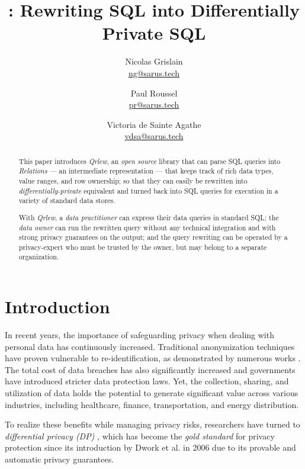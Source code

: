 \documentclass{article}
\title{\qrlew: Rewriting SQL into Differentially Private SQL}
\author {
    Nicolas Grislain\\
    \href{mailto:ng@sarus.tech}{ng@sarus.tech}
    \and
    Paul Roussel\\
    \href{mailto:pr@sarus.tech}{pr@sarus.tech}
    \and
    Victoria de Sainte Agathe\\
    \href{mailto:vdsa@sarus.tech}{vdsa@sarus.tech}
}
\date{\displaydate{date}}
\newcommand{\qrlew}{\emph{Qrlew}}
\begin{document}
\maketitle

\begin{abstract}
    This paper introduces \qrlew{}, an \emph{open source} library that can parse SQL queries into \emph{Relations} --- an intermediate representation --- that keeps track of rich data types, value ranges, and row ownership; so that they can easily be rewritten into \emph{differentially-private} equivalent and turned back into SQL queries for execution in a variety of standard data stores.
    
    With \qrlew{}, a \emph{data practitioner} can express their data queries in standard SQL; the \emph{data owner} can run the rewritten query without any technical integration and with strong privacy guarantees on the output; and the query rewriting can be operated by a privacy-expert who must be trusted by the owner, but may belong to a separate organization.
    \end{abstract}
    
    \section{Introduction}
    
    In recent years, the importance of safeguarding privacy when dealing with personal data has continuously increased.
    Traditional anonymization techniques have proven vulnerable to re-identification, as demonstrated by numerous works \cite{archie2018s, dwork2017exposed, narayanan2008robust, sweeney2013identifying}.
    The total cost of data breaches has also significantly increased \cite{ibm2023cost} and governments have introduced stricter data protection laws.
    Yet, the collection, sharing, and utilization of data holds the potential to generate significant value across various industries, including healthcare, finance, transportation, and energy distribution.
    
    To realize these benefits while managing privacy risks, researchers have turned to \emph{differential privacy (DP)} \cite{wood2018differential, dwork2014algorithmic}, which has become the \emph{gold standard} for privacy protection since its introduction by Dwork et al. in 2006 \cite{dwork2006calibrating} due to its provable and automatic privacy guarantees.
    
\end{document}
